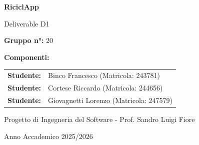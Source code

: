 \documentclass[12pt,a4paper]{article}
\begin{document}
\begin{titlepage}
    \centering
    \vspace*{2cm}
    {\Huge \textbf{RiciclApp} \par}
    \vspace{1cm}
    {\Large Deliverable D1 \par}
    \vspace{3cm}
    
    {\large \textbf{Gruppo n°:} 20 \par}
    \vspace{1.5cm}
    
    {\large \textbf{Componenti:} \par}
    \vspace{0.5cm}
    \begin{tabular}{rl}
        \textbf{Studente:} & Binco Francesco (Matricola: 243781) \\
        \textbf{Studente:} & Cortese Riccardo (Matricola: 244656) \\
        \textbf{Studente:} & Giovagnetti Lorenzo (Matricola: 247579) \\
    \end{tabular}
    
    \vfill
    {\large Progetto di Ingegneria del Software - Prof. Sandro Luigi Fiore \par}
    \vspace{1.5cm}
    {\large Anno Accademico 2025/2026 \par}
    \vspace{2cm}
\end{titlepage}

\begin{abstract}
Il presente progetto descrive l'ideazione e la progettazione di un sistema per l'ottimizzazione della raccolta differenziata urbana. 

L'obiettivo principale dell'applicazione è duplice: da un lato, semplificare il conferimento dei rifiuti per il cittadino attraverso strumenti di riconoscimento (scansione barcode) e localizzazione dei punti di raccolta con relativo stato di riempimento; dall'altro, fornire agli enti comunali e alle aziende di raccolta una visione d'insieme in tempo reale dello stato del territorio. 

Grazie ai dati trasmessi dai sensori IoT installati nei bidoni, l'amministratore può monitorare i livelli di riempimento, identificare le zone critiche e pianificare interventi di svuotamento mirati. Questo approccio permette di passare da una raccolta a calendario a una gestione dinamica "on-demand", riducendo i costi operativi e l'impatto ambientale dei mezzi di trasporto. 

Il sistema si avvale di una rete di sensori IoT installati nei bidoni stradali per il monitoraggio in tempo reale dei livelli di riempimento, permettendo agli operatori ecologici di usufruire di percorsi di raccolta ottimizzati. 
\end{abstract}
\end{document}
